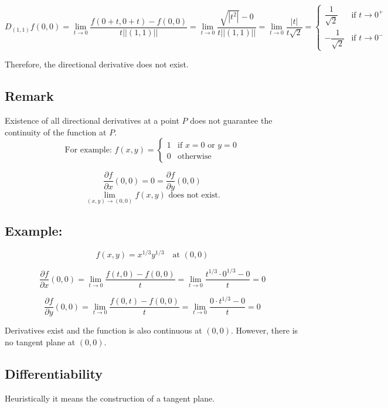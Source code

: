 \documentclass[11pt]{article}
\begin{document}
\[
D_{(1,1)} f(0,0) = \lim_{t \to 0} \frac{f(0 + t, 0 + t) - f(0,0)}{t||(1,1)||} = \lim_{t \to 0} \frac{\sqrt{|t^2|} - 0}{t||(1,1)||} = \lim_{t \to 0} \frac{|t|}{t\sqrt{2}} = 
\begin{cases}
    \dfrac{1}{\sqrt{2}} & \text{if } t \to 0^+ \\
    -\dfrac{1}{\sqrt{2}} & \text{if } t \to 0^-
\end{cases}
\]

Therefore, the directional derivative does not exist.

\subsection{Remark}
Existence of all directional derivatives at a point $P$ does not guarantee the continuity of the function at $P$.
\[
\text{For example: } f(x,y) =
\begin{cases}
    1 & \text{if } x = 0 \text{ or } y = 0 \\
    0 & \text{otherwise}
\end{cases}
\]

\[
\frac{\partial f}{\partial x}(0,0) = 0 = \frac{\partial f}{\partial y}(0,0)
\]
\[
\lim_{(x,y) \to (0,0)} f(x,y) \text{ does not exist.}
\]

\subsection*{Example:}
\[
f(x,y) = x^{1/3}y^{1/3} \quad \text{at } (0,0)
\]

\[
\frac{\partial f}{\partial x}(0,0) = \lim_{t \to 0} \frac{f(t,0) - f(0,0)}{t} = \lim_{t \to 0} \frac{t^{1/3} \cdot 0^{1/3} - 0}{t} = 0
\]

\[
\frac{\partial f}{\partial y}(0,0) = \lim_{t \to 0} \frac{f(0,t) - f(0,0)}{t} = \lim_{t \to 0} \frac{0 \cdot t^{1/3} - 0}{t} = 0
\]

Derivatives exist and the function is also continuous at $(0,0)$. However, there is no tangent plane at $(0,0)$.

\subsection{Differentiability}
Heuristically it means the construction of a tangent plane.
\end{document}
